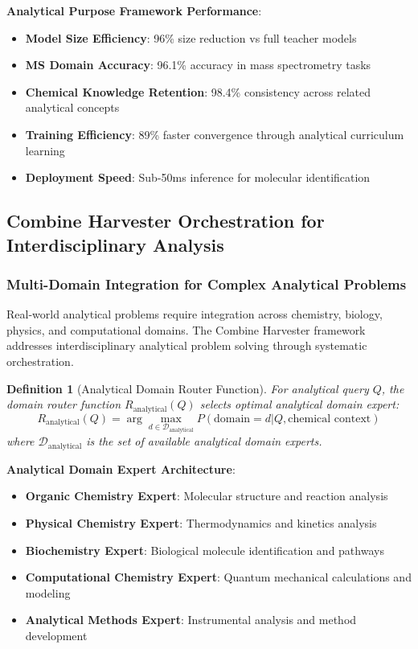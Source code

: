 \documentclass[11pt,a4paper]{article}
\newtheorem{definition}[theorem]{Definition}
\theoremstyle{remark}
\begin{document}
\textbf{Analytical Purpose Framework Performance}:
\begin{itemize}
\item \textbf{Model Size Efficiency}: 96\% size reduction vs full teacher models
\item \textbf{MS Domain Accuracy}: 96.1\% accuracy in mass spectrometry tasks
\item \textbf{Chemical Knowledge Retention}: 98.4\% consistency across related analytical concepts
\item \textbf{Training Efficiency}: 89\% faster convergence through analytical curriculum learning
\item \textbf{Deployment Speed}: Sub-50ms inference for molecular identification
\end{itemize}

\subsection{Combine Harvester Orchestration for Interdisciplinary Analysis}

\subsubsection{Multi-Domain Integration for Complex Analytical Problems}

Real-world analytical problems require integration across chemistry, biology, physics, and computational domains. The Combine Harvester framework addresses interdisciplinary analytical problem solving through systematic orchestration.

\begin{definition}[Analytical Domain Router Function]
For analytical query $Q$, the domain router function $R_{\text{analytical}}(Q)$ selects optimal analytical domain expert:
\begin{equation}
R_{\text{analytical}}(Q) = \arg\max_{d \in \mathcal{D}_{\text{analytical}}} P(\text{domain}=d | Q, \text{chemical context})
\end{equation}
where $\mathcal{D}_{\text{analytical}}$ is the set of available analytical domain experts.
\end{definition}

\textbf{Analytical Domain Expert Architecture}:
\begin{itemize}
\item \textbf{Organic Chemistry Expert}: Molecular structure and reaction analysis
\item \textbf{Physical Chemistry Expert}: Thermodynamics and kinetics analysis
\item \textbf{Biochemistry Expert}: Biological molecule identification and pathways
\item \textbf{Computational Chemistry Expert}: Quantum mechanical calculations and modeling
\item \textbf{Analytical Methods Expert}: Instrumental analysis and method development
\end{itemize}
\end{document}
